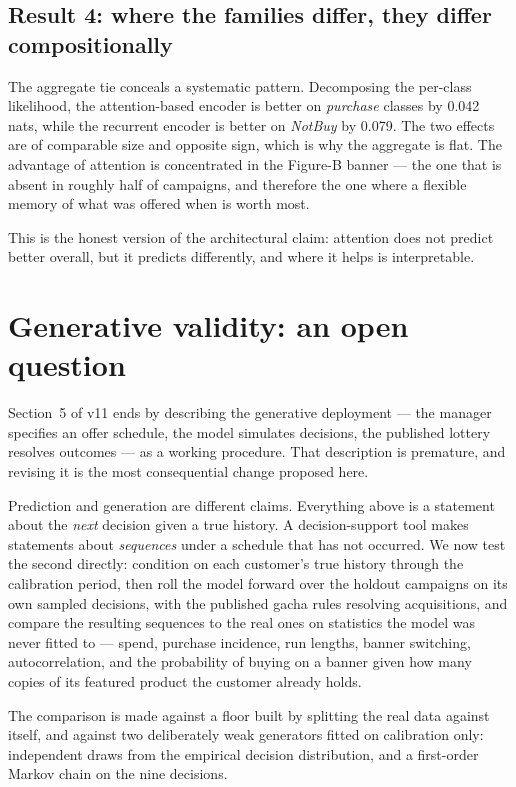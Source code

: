 \documentclass[11pt]{article}
\begin{document}
\subsection*{Result 4: where the families differ, they differ compositionally}

The aggregate tie conceals a systematic pattern. Decomposing the per-class
likelihood, the attention-based encoder is better on \emph{purchase} classes by
0.042 nats, while the recurrent encoder is better on \emph{NotBuy} by 0.079.
The two effects are of comparable size and opposite sign, which is why the
aggregate is flat. The advantage of attention is concentrated in the
Figure-B banner --- the one that is absent in roughly half of campaigns, and
therefore the one where a flexible memory of what was offered when is worth
most.

This is the honest version of the architectural claim: attention does not
predict better overall, but it predicts differently, and where it helps is
interpretable.

\section{Generative validity: an open question}\label{sec:gen}

Section~5 of v11 ends by describing the generative deployment --- the manager
specifies an offer schedule, the model simulates decisions, the published
lottery resolves outcomes --- as a working procedure. That description is
premature, and revising it is the most consequential change proposed here.

Prediction and generation are different claims. Everything above is a statement
about the \emph{next} decision given a true history. A decision-support tool
makes statements about \emph{sequences} under a schedule that has not occurred.
We now test the second directly: condition on each customer's true history
through the calibration period, then roll the model forward over the holdout
campaigns on its own sampled decisions, with the published gacha rules resolving
acquisitions, and compare the resulting sequences to the real ones on statistics
the model was never fitted to --- spend, purchase incidence, run lengths, banner
switching, autocorrelation, and the probability of buying on a banner given how
many copies of its featured product the customer already holds.

The comparison is made against a floor built by splitting the real data against
itself, and against two deliberately weak generators fitted on calibration only:
independent draws from the empirical decision distribution, and a first-order
Markov chain on the nine decisions.
\end{document}
